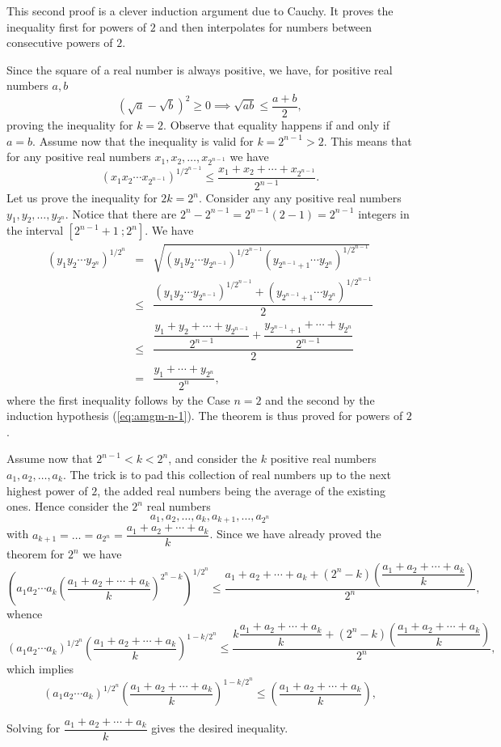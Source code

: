 \documentclass[11pt, openany]{book}
\theoremstyle{change} \theoremheaderfont{\blue\sffamily\bfseries}
\newcommand{\proofsymbol}{\Pisymbol{pzd}{113}}
\theoremstyle{nonumberplain} \theoremheaderfont{\sffamily\bfseries}
\newenvironment{s-pf}[0]{\itshape\begin{quote}{\bf Second Proof: \ }}{\proofsymbol\end{quote}}
\def\lcrc#1#2{\left[#1 \ ; #2 \right]}
\newcommand{\í}{\'{\i}}
\begin{document}
\begin{s-pf}
This second proof is a clever induction argument due to Cauchy. It
proves the inequality first for powers of $2$ and then interpolates
for numbers between consecutive powers of $2$.

\bigskip
 Since the square of a
real number is always positive, we have, for positive real numbers
$a, b$
$$ (\sqrt{a}-\sqrt{b})^2 \geq 0 \implies \sqrt{ab} \leq \dfrac{a+b}{2},
$$proving the inequality for $k=2$. Observe that equality happens if and only if $a=b$. Assume now that the inequality
is valid for $k=2^{n-1}>2$. This means that for any positive real
numbers $x_1, x_2, \ldots , x_{2^{n-1}} $ we have
\begin{equation}\label{eq:amgm-n-1}
\left(x_1x_2\cdots x_{2^{n-1}}\right)^{1/2^{n-1}} \leq
\dfrac{x_1+x_2+\cdots +x_{2^{n-1}}}{2^{n-1}}.
\end{equation}
Let us prove the inequality for $2k=2^n$. Consider any any positive
real numbers $y_1, y_2, \ldots , y_{2^{n}}$. Notice that there are
$2^n-2^{n-1} = 2^{n-1}(2-1) = 2^{n-1}$ integers in the interval
$\lcrc{2^{n-1}+1}{2^n}$. We have
$$\begin{array}{lll}\left(y_1y_2\cdots y_{2^{n}}\right)^{1/2^{n}} & = &
\sqrt{\left(y_1y_2\cdots
y_{2^{n-1}}\right)^{1/2^{n-1}}\left(y_{2^{n-1}+1}\cdots
y_{2^{n}}\right)^{1/2^{n-1}}} \\
& \leq & \dfrac{\left(y_1y_2\cdots
y_{2^{n-1}}\right)^{1/2^{n-1}}+\left(y_{2^{n-1}+1}\cdots
y_{2^{n}}\right)^{1/2^{n-1}}}{2}\\
& \leq & \dfrac{\dfrac{y_1+y_2+\cdots
+y_{2^{n-1}}}{2^{n-1}}+\dfrac{y_{2^{n-1}+1}+\cdots
+y_{2^{n}}}{2^{n-1}}}{2}\\
& = & \dfrac{y_1 + \cdots + y_{2^n}}{2^n},
\end{array}$$
where the first inequality follows by the Case $n=2$ and the second
by the induction hypothesis (\ref{eq:amgm-n-1}). The theorem is thus
proved for powers of $2$.

\bigskip

Assume now that $2^{n-1}<k<2^n$, and consider the $k$ positive real
numbers $a_1, a_2, \ldots , a_k$. The trick is to pad this
collection of real numbers up to the next highest power of $2$, the
added real numbers being the average of the existing ones. Hence
consider the $2^n$ real numbers
$$a_1, a_2, \ldots , a_k, a_{k+1}, \ldots , a_{2^n}  $$
with $a_{k+1}= \ldots = a_{2^n}=\dfrac{a_1+ a_2+ \cdots + a_k}{k}$.
Since we have already proved the theorem for $2^n$ we have
$$ \left(a_1a_2\cdots a_k\left(\dfrac{a_1+ a_2+ \cdots + a_k}{k}\right)^{2^n-k}\right)^{1/2^n} \leq
\dfrac{a_1+ a_2+ \cdots + a_k+(2^n-k)\left(\dfrac{a_1+ a_2+ \cdots +
a_k}{k}\right)}{2^n},$$whence $$\left(a_1a_2\cdots
a_k\right)^{1/2^n}\left(\dfrac{a_1+ a_2+ \cdots +
a_k}{k}\right)^{1-k/2^n} \leq \dfrac{k\dfrac{a_1+ a_2+ \cdots +
a_k}{k}+(2^n-k)\left(\dfrac{a_1+ a_2+ \cdots + a_k}{k}\right)}{2^n},
$$which implies
$$\left(a_1a_2\cdots
a_k\right)^{1/2^n}\left(\dfrac{a_1+ a_2+ \cdots +
a_k}{k}\right)^{1-k/2^n} \leq \left(\dfrac{a_1+ a_2+ \cdots +
a_k}{k}\right),
$$


Solving for $\dfrac{a_1+ a_2+ \cdots + a_k}{k}$ gives the desired
inequality.
\end{s-pf}
\end{document}
